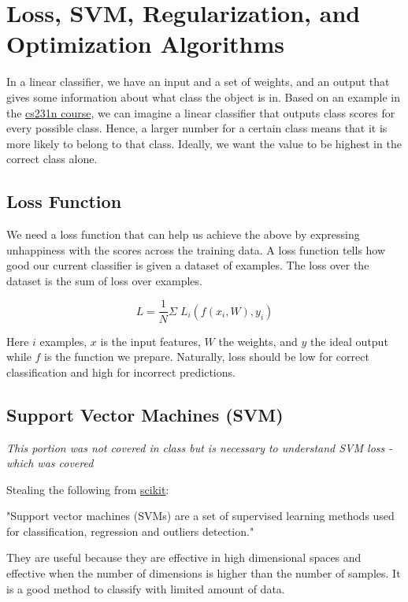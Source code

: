 \chapter{Loss, SVM, Regularization, and Optimization Algorithms}

In a linear classifier, we have an input and a set of weights, and an output that gives some information about what class the object is in. Based on an example in the \href{http://cs231n.stanford.edu/slides/2017/cs231n_2017_lecture3.pdf}{cs231n course}, we can imagine a linear classifier that outputs class scores for every possible class. Hence, a larger number for a certain class means that it is more likely to belong to that class. Ideally, we want the value to be highest in the correct class alone.

\section{Loss Function}

We need a loss function that can help us achieve the above by expressing unhappiness with the scores across the training data. A loss function tells how good our current classifier is given a dataset of examples. The loss over the dataset is the sum of loss over examples.

\begin{equation}
    L = \frac{1}{N} \Sigma \;  L_i (f(x_i, W), y_i)
\end{equation}

Here $i$ examples, $x$ is the input features, $W$ the weights, and $y$ the ideal output while $f$ is the function we prepare. Naturally, loss should be low for correct classification and high for incorrect predictions.

\section{Support Vector Machines (SVM)}

\textit{This portion was not covered in class but is necessary to understand SVM loss - which was covered}

Stealing the following from \href{https://scikit-learn.org/stable/modules/svm.html}{scikit}:

"Support vector machines (SVMs) are a set of supervised learning methods used for classification, regression and outliers detection."

They are useful because they are effective in high dimensional spaces and effective when the number of dimensions is higher than the number of samples. It is a good method to classify with limited amount of data. 

